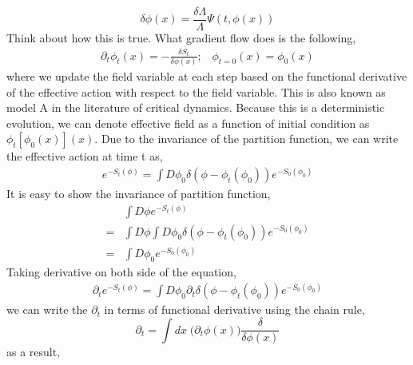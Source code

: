 \documentclass[a4paper,11pt]{article}
\begin{document}
\begin{equation}
\delta \phi(x)=\frac{\delta \Lambda}{ \Lambda} \Psi(t, \phi(x))
\end{equation}
{\color{red} Think about how this is true.} What gradient flow does is the following\cite{Abe:2018zdc},
\begin{equation}
\begin{split}
\partial_t \phi_t(x)=-\frac{\delta S_t}{\delta \phi(x)} ;\;\;\; \phi_{t=0}(x)=\phi_0(x) \label{Eq:GF1}
\end{split}
\end{equation}
where we update the field variable at each step based on the functional derivative of the effective action with respect to the field variable. This is also known as model A in the literature of critical dynamics. Because this is a deterministic evolution, we can denote effective field as a function of initial condition as $\phi_t[\phi_0(x)](x)$. Due to the invariance of the partition function, we can write the effective action at time t as,
\begin{equation}
\begin{split}
e^{-S_t(\phi)}=\int D\phi_0 \delta(\phi-\phi_t(\phi_0)) e^{-S_0(\phi_0)}\label{Eq:GF2}
\end{split}
\end{equation}
{\color{red} It is easy to show the invariance of partition function,
\begin{equation}
\begin{split}
&
\int D \phi e^{-S_t(\phi)}\\
=&\int D \phi \int D\phi_0 \delta(\phi-\phi_t(\phi_0)) e^{-S_0(\phi_0)}\\
=& \int D \phi_0 e^{-S_0(\phi_0)}
\end{split}
\end{equation}
}
Taking derivative on both side of the equation,
\begin{equation}
\begin{split}
\partial_t e^{-S_t(\phi)}=\int D\phi_0 \partial_t\delta(\phi-\phi_t(\phi_0)) e^{-S_0(\phi_0)}
\end{split}
\end{equation}
we can write the $\partial_t$ in terms of functional derivative using the chain rule,
\begin{equation}
\partial_t= \int dx \;\Big(\partial_t \phi(x) \Big)\frac{\delta}{\delta \phi(x)}
\end{equation}
as a result,
\end{document}
